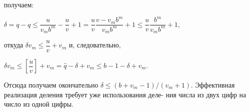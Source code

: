 \noindent
получаем:
\begin{center}
$\delta=\hat{q}-q\leqslant\dfrac{u}{v_mb^m}-\dfrac{u}{v}+1=\dfrac{u}{v}\dfrac{v-v_mb^m}{v_mb^m}+1\leqslant\dfrac{u}{v}\dfrac{b^m}{v_mb^m}+1$,
\end{center}
откуда $\delta{v_m\leqslant{\dfrac{u}{v}}+v_m}$ и, следовательно,
\begin{center}
$\delta{v_m}\leqslant\left[\dfrac{u}{v}\right]+v_m=\hat{q}-\delta+v_m\leqslant{b-1-\delta+v_m}$.
\end{center}
Отсюда получаем окончательно $\delta\leqslant(b+v_m-1)/(v_m+1)$.\newline
\hspace*{15pt}Эффективная реализация деления требует уже использования деле-\linebreak
ния числа из двух цифр на число из одной цифры.\\

